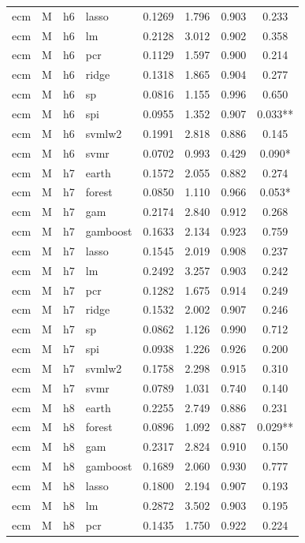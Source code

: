 \begin{ThreePartTable}
\begin{longtable}[t]{llclcccc}
ecm & M & h6 & lasso & 0.1269 & 1.796 & 0.903 & 0.233\\
ecm & M & h6 & lm & 0.2128 & 3.012 & 0.902 & 0.358\\
ecm & M & h6 & pcr & 0.1129 & 1.597 & 0.900 & 0.214\\
ecm & M & h6 & ridge & 0.1318 & 1.865 & 0.904 & 0.277\\
ecm & M & h6 & sp & 0.0816 & 1.155 & 0.996 & 0.650\\
ecm & M & h6 & spi & 0.0955 & 1.352 & 0.907 & 0.033**\\
ecm & M & h6 & svmlw2 & 0.1991 & 2.818 & 0.886 & 0.145\\
ecm & M & h6 & svmr & 0.0702 & 0.993 & 0.429 & 0.090*\\
\addlinespace
ecm & M & h7 & earth & 0.1572 & 2.055 & 0.882 & 0.274\\
ecm & M & h7 & forest & 0.0850 & 1.110 & 0.966 & 0.053*\\
ecm & M & h7 & gam & 0.2174 & 2.840 & 0.912 & 0.268\\
ecm & M & h7 & gamboost & 0.1633 & 2.134 & 0.923 & 0.759\\
ecm & M & h7 & lasso & 0.1545 & 2.019 & 0.908 & 0.237\\
ecm & M & h7 & lm & 0.2492 & 3.257 & 0.903 & 0.242\\
ecm & M & h7 & pcr & 0.1282 & 1.675 & 0.914 & 0.249\\
ecm & M & h7 & ridge & 0.1532 & 2.002 & 0.907 & 0.246\\
ecm & M & h7 & sp & 0.0862 & 1.126 & 0.990 & 0.712\\
ecm & M & h7 & spi & 0.0938 & 1.226 & 0.926 & 0.200\\
ecm & M & h7 & svmlw2 & 0.1758 & 2.298 & 0.915 & 0.310\\
ecm & M & h7 & svmr & 0.0789 & 1.031 & 0.740 & 0.140\\
\addlinespace
ecm & M & h8 & earth & 0.2255 & 2.749 & 0.886 & 0.231\\
ecm & M & h8 & forest & 0.0896 & 1.092 & 0.887 & 0.029**\\
ecm & M & h8 & gam & 0.2317 & 2.824 & 0.910 & 0.150\\
ecm & M & h8 & gamboost & 0.1689 & 2.060 & 0.930 & 0.777\\
ecm & M & h8 & lasso & 0.1800 & 2.194 & 0.907 & 0.193\\
ecm & M & h8 & lm & 0.2872 & 3.502 & 0.903 & 0.195\\
ecm & M & h8 & pcr & 0.1435 & 1.750 & 0.922 & 0.224\\

\end{longtable}
\end{ThreePartTable}
